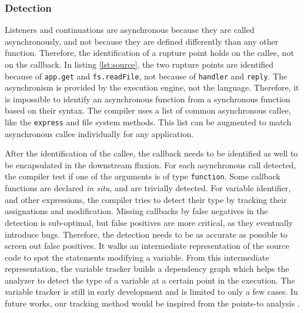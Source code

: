\subsubsection{Detection}

Listeners and continuations are asynchronous because they are called asynchronously, and not because they are defined differently than any other function.
Therefore, the identification of a rupture point holds on the callee, not on the callback.
In listing \ref{lst:source}, the two rupture points are identified because of \texttt{app.get} and \texttt{fs.readFile}, not because of \texttt{handler} and \texttt{reply}.
The asynchronism is provided by the execution engine, not the language.
Therefore, it is impossible to identify an asynchronous function from a synchronous function based on their syntax.
The compiler uses a list of common asynchronous callee, like the \texttt{express} and file system methods.
This list can be augmented to match asynchronous callee individually for any application.


After the identification of the callee, the callback needs to be identified as well to be encapsulated in the downstream fluxion.
For each asynchronous call detected, the compiler test if one of the arguments is of type \texttt{function}.
Some callback functions are declared \textit{in situ}, and are trivially detected.
For variable identifier, and other expressions, the compiler tries to detect their type by tracking their assignations and modification.
Missing callbacks by false negatives in the detection is sub-optimal, but false positives are more critical, as they eventually introduce bugs.
Therefore, the detection needs to be as accurate as possible to screen out false positives.
It walks an intermediate representation of the source code to spot the statements modifying a variable.
From this intermediate representation, the variable tracker builds a dependency graph which helps the analyzer to detect the type of a variable at a certain point in the execution.
The variable tracker is still in early development and is limited to only a few cases.
In future works, our tracking method would be inspired from the points-to analysis \cite{Wei2014}.

